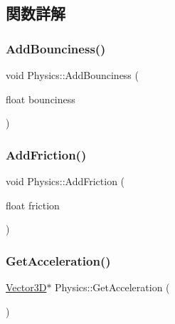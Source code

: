\subsection{関数詳解}
\mbox{\label{class_physics_af88191e5605a97952caefd19319b05f9}} 
\subsubsection{\texorpdfstring{Add\+Bounciness()}{AddBounciness()}}
{\footnotesize\ttfamily void Physics\+::\+Add\+Bounciness (\begin{DoxyParamCaption}\item[{float}]{bounciness }\end{DoxyParamCaption})\hspace{0.3cm}{\ttfamily [inline]}}

\mbox{\label{class_physics_a77e9a04f034ccad4fec996832fb7ce63}} 
\subsubsection{\texorpdfstring{Add\+Friction()}{AddFriction()}}
{\footnotesize\ttfamily void Physics\+::\+Add\+Friction (\begin{DoxyParamCaption}\item[{float}]{friction }\end{DoxyParamCaption})\hspace{0.3cm}{\ttfamily [inline]}}

\mbox{\label{class_physics_aee9ce4604f63dbdcab07ded4d0174989}} 
\subsubsection{\texorpdfstring{Get\+Acceleration()}{GetAcceleration()}}
{\footnotesize\ttfamily \mbox{\hyperlink{class_vector3_d}{Vector3D}}$\ast$ Physics\+::\+Get\+Acceleration (\begin{DoxyParamCaption}{ }\end{DoxyParamCaption})\hspace{0.3cm}{\ttfamily [inline]}}

